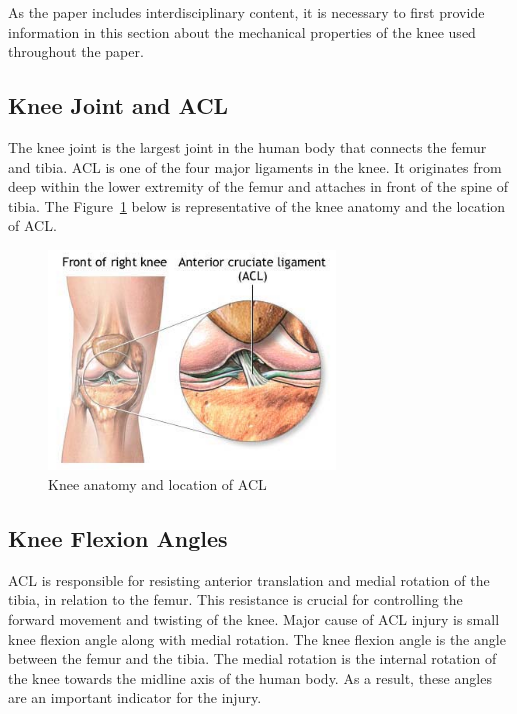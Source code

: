 As the paper includes interdisciplinary content, it is necessary to first provide information in this section about the mechanical properties of the knee used throughout the paper. 
\subsection{Knee Joint and ACL} 
The knee joint is the largest joint in the human body that connects the femur and tibia. ACL is one of the four major ligaments in the knee. It originates from deep within the lower extremity of the femur and attaches in front of the spine of tibia. The Figure~\ref{fig:knee_anatomy} below is representative of the knee anatomy and the location of ACL. 

\begin{figure}[h]
  \begin{center}
    \includegraphics[width=3in]{images/acl_anatomy.png}
  \end{center}
  \caption{Knee anatomy and location of ACL}
  \label{fig:knee_anatomy}
\end{figure}

\subsection{Knee Flexion Angles}
ACL is responsible for resisting anterior translation and medial rotation of the tibia, in relation to the femur. This resistance is crucial for controlling the forward movement and twisting of the knee. Major cause of ACL injury is small knee flexion angle along with medial rotation. The knee flexion angle is the angle between the femur and the tibia. The medial rotation is the internal rotation of the knee towards the midline axis of the human body. As a result, these angles are an important indicator for the injury.

